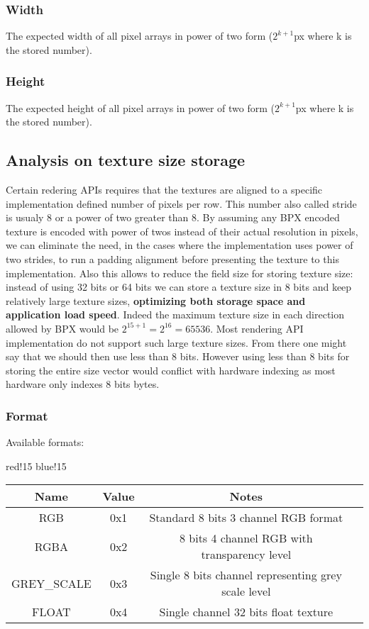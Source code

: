 \subsubsection{Width}
The expected width of all pixel arrays in power of two form ($2^{k+1}$px where k is the stored number).

\subsubsection{Height}
The expected height of all pixel arrays in power of two form ($2^{k+1}$px where k is the stored number).

\subsection{Analysis on texture size storage}
Certain redering APIs requires that the textures are aligned to a specific implementation defined number of pixels per row. This number also called stride is usualy 8 or a power of two greater than 8.\newline
By assuming any BPX encoded texture is encoded with power of twos instead of their actual resolution in pixels, we can eliminate the need, in the cases where the implementation uses power of two strides, to run a padding alignment before presenting the texture to this implementation. Also this allows to reduce the field size for storing texture size: instead of using 32 bits or 64 bits we can store a texture size in 8 bits and keep relatively large texture sizes, \textbf{optimizing both storage space and application load speed}. Indeed the maximum texture size in each direction allowed by BPX would be $2^{15 + 1} = 2^{16} = 65536$. Most rendering API implementation do not support such large texture sizes.\newline
From there one might say that we should then use less than 8 bits. However using less than 8 bits for storing the entire size vector would conflict with hardware indexing as most hardware only indexes 8 bits bytes.

\subsubsection{Format}
Available formats:
\begin{center}
    {
        {red!15}
        {blue!15}
        \begin{tabular}{|c|c|c|c|}
            \hline
            \textbf{Name} & \textbf{Value} & \textbf{Notes} \\

            \hline\hline
            RGB & 0x1 & Standard 8 bits 3 channel RGB format \\
            RGBA & 0x2 & 8 bits 4 channel RGB with transparency level \\
            GREY\_SCALE & 0x3 & Single 8 bits channel representing grey scale level \\
            FLOAT & 0x4 & Single channel 32 bits float texture \\
            \hline
        \end{tabular}
    }
\end{center}

